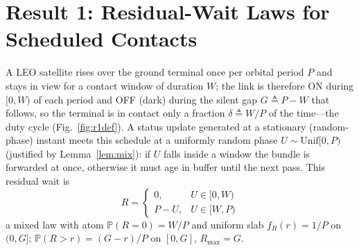 \documentclass[twocolumn,3p,times,procedia]{elsarticle}
\newcommand{\Prob}{\mathbb{P}}
\begin{document}
\section{Result 1: Residual-Wait Laws for Scheduled
Contacts}\label{sec:r1}
A LEO satellite rises over the ground terminal once per orbital period
$P$ and stays in view for a contact window of duration $W$; the link is
therefore ON during $[0,W)$ of each period and OFF (dark) during the
silent gap $G\triangleq P-W$ that follows, so the terminal is in contact
only a fraction $\delta\triangleq W/P$ of the time---the duty cycle
(Fig.~\ref{fig:r1def}). A status update generated at a stationary
(random-phase) instant meets this schedule at a uniformly random phase $U\sim\mathrm{Unif}[0,P)$
(justified by Lemma~\ref{lem:mix}): if $U$ falls inside a window the
bundle is forwarded at once, otherwise it must age in buffer until the
next pass. This residual wait is
\begin{equation}
R=\begin{cases}0,& U\in[0,W)\\ P-U,& U\in[W,P)\end{cases}
\end{equation}
a mixed law with atom $\Prob(R=0)=W/P$ and uniform slab $f_R(r)=1/P$ on
$(0,G]$; $\Prob(R>r)=(G-r)/P$ on $[0,G]$, $R_{\max}=G$.
\end{document}
